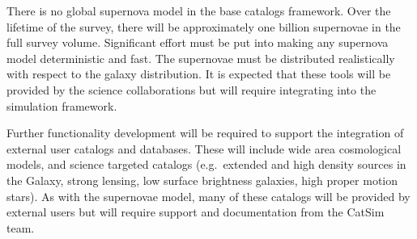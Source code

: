 \documentclass[11pt]{article}
\begin{document}
There is no global supernova model in the base catalogs framework.
Over the lifetime of the survey, there will be approximately one
billion supernovae in the full survey volume.  Significant effort must
be put into making any supernova model deterministic and fast.  The
supernovae must be distributed realistically with respect to the
galaxy distribution.  It is expected that these tools will be provided
by the science collaborations but will require integrating into the
simulation framework.

Further functionality development will be required to support the
integration of external user catalogs and databases. These will
include wide area cosmological models, and science targeted catalogs
(e.g.\ extended and high density sources in the Galaxy, strong
lensing, low surface brightness galaxies, high proper motion stars).
As with the supernovae model, many of these catalogs will be provided
by external users but will require support and documentation from the
CatSim team.




\end{document}
